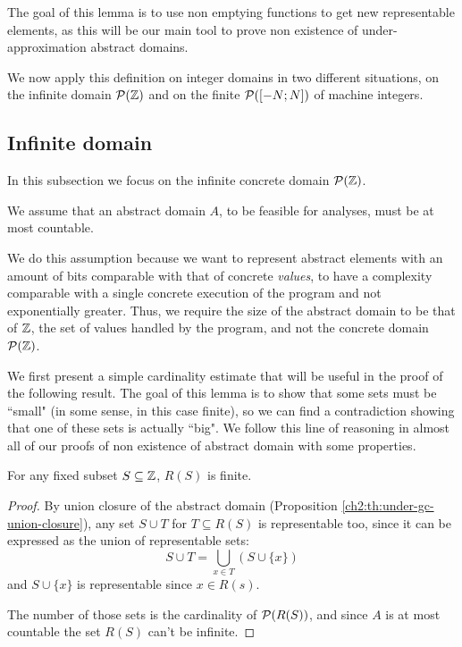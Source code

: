 The goal of this lemma is to use non emptying functions to get new representable elements, as this will be our main tool to prove non existence of under-approximation abstract domains.

We now apply this definition on integer domains in two different situations, on the infinite domain $\mathcal{P}(\mathbb{Z})$ and on the finite $\mathcal{P}([-N; N])$ of machine integers.

\subsection{Infinite domain}
In this subsection we focus on the infinite concrete domain $\mathcal{P}(\mathbb{Z})$.
\begin{assumption}
	We assume that an abstract domain $A$, to be feasible for analyses, must be at most countable.
\end{assumption}
We do this assumption because we want to represent abstract elements with an amount of bits comparable with that of concrete \textit{values}, to have a complexity comparable with a single concrete execution of the program and not exponentially greater. Thus, we require the size of the abstract domain to be that of $\mathbb{Z}$, the set of values handled by the program, and not the concrete domain $\mathcal{P}(\mathbb{Z})$.

We first present a simple cardinality estimate that will be useful in the proof of the following result. The goal of this lemma is to show that some sets must be ``small" (in some sense, in this case finite), so we can find a contradiction showing that one of these sets is actually ``big". We follow this line of reasoning in almost all of our proofs of non existence of abstract domain with some properties.

\begin{lemma}\label{ch3:th:R-S-bound-integer-inf}
	For any fixed subset $S \subseteq \mathbb{Z}$, $R(S)$ is finite.
\end{lemma}
\begin{proof}
	By union closure of the abstract domain (Proposition \ref{ch2:th:under-gc-union-closure}), any set $S \cup T$ for $T \subseteq R(S)$ is representable too, since it can be expressed as the union of representable sets:
	\[
	S \cup T = \bigcup\limits_{x \in T} (S \cup \{ x \})
	\]
	and $S \cup \{ x \}$ is representable since $x \in R(s)$.

	The number of those sets is the cardinality of $\mathcal{P}(R(S))$, and since $A$ is at most countable the set $R(S)$ can't be infinite.
\end{proof}

